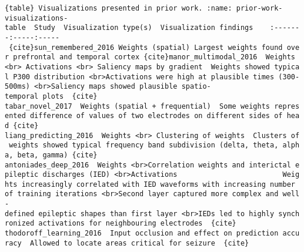 \documentclass[11pt]{article}
\begin{document}
    \texttt{\{table\}\ Visualizations\ presented\ in\ prior\ work.\ :name:\ prior-work-visualizations-table\ \textbar{}\ Study\ \textbar{}\ Visualization\ type(s)\ \textbar{}\ Visualization\ findings\ \ \ \textbar{}\ \textbar{}:-\/-\/-\/-\/-\/-\/-\textbar{}:-\/-\/-\/-\/-\textbar{}:-\/-\/-\/-\/-\textbar{}\ \textbar{}\{cite\}\textasciigrave{}sun\_remembered\_2016\textasciigrave{}\textbar{}\ Weights\ (spatial)\textbar{}\ Largest\ weights\ found\ over\ prefrontal\ and\ temporal\ cortex\textbar{}\ \textbar{}\{cite\}\textasciigrave{}manor\_multimodal\_2016\textasciigrave{}\ \textbar{}\ Weights\ \textless{}br\textgreater{}\ Activations\ \textless{}br\textgreater{}\ Saliency\ maps\ by\ gradient\ \textbar{}\ Weights\ showed\ typical\ P300\ distribution\ \textless{}br\textgreater{}Activations\ were\ high\ at\ plausible\ times\ (300-500ms)\ \textless{}br\textgreater{}Saliency\ maps\ showed\ plausible\ spatio-temporal\ plots\textbar{}\ \ \textbar{}\{cite\}
    \textasciigrave{}tabar\_novel\_2017\textasciigrave{}\ \textbar{}\ Weights\ (spatial\ +\ frequential)\ \textbar{}\ Some\ weights\ represented\ difference\ of\ values\ of\ two\ electrodes\ on\ different\ sides\ of\ head\textbar{}\ \textbar{}\{cite\}
    \textasciigrave{}liang\_predicting\_2016\textasciigrave{}\ \textbar{}\ Weights\ \textless{}br\textgreater{}\ Clustering\ of\ weights\ \textbar{}\ Clusters\ of\ weights\ showed\ typical\ frequency\ band\ subdivision\ (delta,\ theta,\ alpha,\ beta,\ gamma)\textbar{}\ \textbar{}\{cite\}
    \textasciigrave{}antoniades\_deep\_2016\textasciigrave{}\ \textbar{}\ Weights\ \textless{}br\textgreater{}Correlation\ weights\ and\ interictal\ epileptic\ discharges\ (IED)\ \textless{}br\textgreater{}Activations\ \ \ \ \ \ \ \ \ \ \ \ \ \ \ \ \ \ \ \ \ \ \ \ \textbar{}\ Weights\ increasingly\ correlated\ with\ IED\ waveforms\ with\ increasing\ number\ of\ training\ iterations\ \textless{}br\textgreater{}Second\ layer\ captured\ more\ complex\ and\ well-defined\ epileptic\ shapes\ than\ first\ layer\ \textless{}br\textgreater{}IEDs\ led\ to\ highly\ synchronized\ activations\ for\ neighbouring\ electrodes\ \textbar{}\ \textbar{}\{cite\}
    \textasciigrave{}thodoroff\_learning\_2016\textasciigrave{}\ \textbar{}\ Input\ occlusion\ and\ effect\ on\ prediction\ accuracy\ \textbar{}\ Allowed\ to\ locate\ areas\ critical\ for\ seizure\ \textbar{}\ \textbar{}\{cite\}\textasciigrave{}
}
\end{document}
